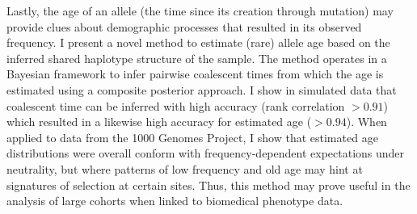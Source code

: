 Lastly, the age of an allele (the time since its creation through mutation) may provide clues about demographic processes that resulted in its observed frequency.
I present a novel method to estimate (rare) allele age based on the inferred shared haplotype structure of the sample.
The method operates in a Bayesian framework to infer pairwise coalescent times from which the age is estimated using a composite posterior approach.
I show in simulated data that coalescent time can be inferred with high accuracy (rank correlation ${>0.91}$) which resulted in a likewise high accuracy for estimated age (${>0.94}$).
When applied to data from the 1000 Genomes Project, I show that estimated age distributions were overall conform with frequency-dependent expectations under neutrality, but where patterns of low frequency and old age may hint at signatures of selection at certain sites.
Thus, this method may prove useful in the analysis of large cohorts when linked to biomedical phenotype data.






